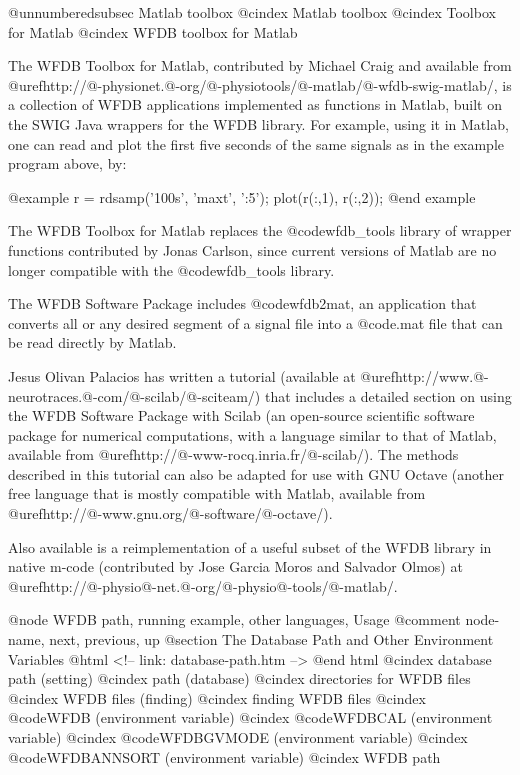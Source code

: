 {@unnumberedsubsec Matlab toolbox
@cindex Matlab toolbox
@cindex Toolbox for Matlab
@cindex WFDB toolbox for Matlab

The WFDB Toolbox for Matlab, contributed by Michael Craig and available from
@uref{http://@-physionet.@-org/@-physiotools/@-matlab/@-wfdb-swig-matlab/},
is a collection of WFDB applications implemented as functions in Matlab,
built on the SWIG Java wrappers for the WFDB library.  For example, using it
in Matlab, one can read and plot the first five seconds of the same signals
as in the example program above, by:

@example
r = rdsamp('100s', 'maxt', ':5');
plot(r(:,1), r(:,2));
@end example

The WFDB Toolbox for Matlab replaces the @code{wfdb_tools} library of wrapper
functions contributed by Jonas Carlson, since current versions of Matlab are
no longer compatible with the @code{wfdb_tools} library.

The WFDB Software Package includes @code{wfdb2mat}, an application that
converts all or any desired segment of a signal file into a @code{.mat}
file that can be read directly by Matlab. 

Jesus Olivan Palacios has written a tutorial (available at
@uref{http://www.@-neurotraces.@-com/@-scilab/@-sciteam/}) that includes a
detailed section on using the WFDB
Software Package with Scilab (an open-source scientific software
package for numerical computations, with a language similar to that of Matlab,
available from @uref{http://@-www-rocq.inria.fr/@-scilab/}).  The methods
described in this tutorial can also be adapted for use with GNU Octave
(another free language that is mostly compatible with Matlab, available from
@uref{http://@-www.gnu.org/@-software/@-octave/}).

Also available is a reimplementation of a useful subset of the WFDB
library in native m-code (contributed by Jose Garcia Moros and Salvador Olmos)
at @uref{http://@-physio@-net.@-org/@-physio@-tools/@-matlab/}.

@node     WFDB path, running example, other languages, Usage
@comment  node-name,  next,  previous,  up
@section The Database Path and Other Environment Variables
@html
<!-- link: database-path.htm -->
@end html
@cindex database path (setting)
@cindex path (database)
@cindex directories for WFDB files
@cindex WFDB files (finding)
@cindex finding WFDB files
@cindex @code{WFDB} (environment variable)
@cindex @code{WFDBCAL} (environment variable)
@cindex @code{WFDBGVMODE} (environment variable)
@cindex @code{WFDBANNSORT} (environment variable)
@cindex WFDB path

}
